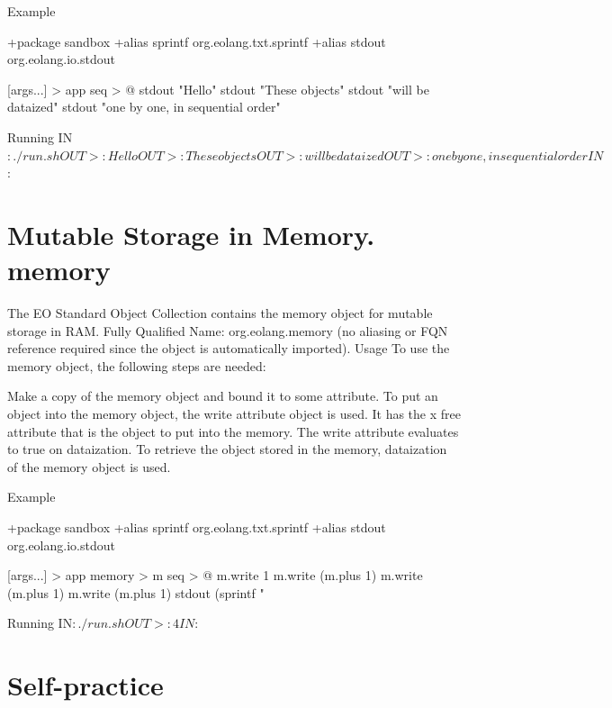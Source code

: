 \documentclass[12pt]{book}
\begin{document}
Example
\begin{ffcode}
+package sandbox
+alias sprintf org.eolang.txt.sprintf
+alias stdout org.eolang.io.stdout

[args...] > app
  seq > @
    stdout "Hello\n"
    stdout "These objects\n"
    stdout "will be dataized\n"
    stdout "one by one, in sequential order\n"

Running
IN$: ./run.sh
OUT>: Hello
OUT>: These objects
OUT>: will be dataized
OUT>: one by one, in sequential order
IN$: 
\end{ffcode}

\section{Mutable Storage in Memory. memory}
The EO Standard Object Collection contains the memory object for mutable storage in RAM.
Fully Qualified Name: org.eolang.memory (no aliasing or FQN reference required since the object is automatically imported).
Usage To use the memory object, the following steps are needed:

Make a copy of the memory object and bound it to some attribute.
To put an object into the memory object, the write attribute object is used. It has the x free attribute that is the object to put into the memory. The write attribute evaluates to true on dataization.
To retrieve the object stored in the memory, dataization of the memory object is used.

Example
\begin{ffcode}
+package sandbox
+alias sprintf org.eolang.txt.sprintf
+alias stdout org.eolang.io.stdout

[args...] > app
  memory > m
  seq > @
    m.write 1
    m.write (m.plus 1)
    m.write (m.plus 1)
    m.write (m.plus 1)
    stdout (sprintf "%

Running
IN$: ./run.sh
OUT>: 4
IN$: 
\end{ffcode}

\section{Self-practice}
\end{document}
